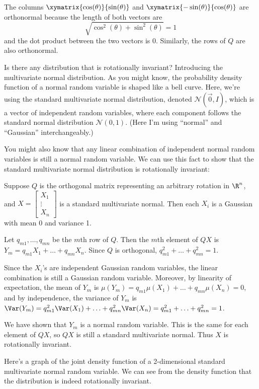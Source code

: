 \documentclass{article}
\begin{document}
The columns $\xymatrix{\cos(\theta)}{\sin(\theta)}$ and $\xymatrix{-\sin(\theta)}{\cos(\theta)}$ are orthonormal because the length of both vectors are
\[
  \sqrt{\cos^2(\theta) + \sin^2(\theta)} = 1
\]
and the dot product between the two vectors is 0. Similarly, the rows of $Q$ are also orthonormal.


Is there any distribution that is rotationally invariant? Introducing the multivariate normal distribution. As you might know, the probability density function of a normal random variable is shaped like a bell curve. Here, we're using the standard multivariate normal distribution, denoted $\mathcal{N}(\vec{0}, I)$, which is a vector of independent random variables, where each component follows the standard normal distribution $\mathcal{N}(0, 1)$. (Here I'm using ``normal'' and ``Gaussian'' interchangeably.)

You might also know that any linear combination of independent normal random variables is still a normal random variable. We can use this fact to show that the standard multivariate normal distribution is rotationally invariant:

Suppose $Q$ is the orthogonal matrix representing an arbitrary rotation in $\R^n$, and
$X = \begin{bmatrix}
    X_1 \\ \vdots \\ X_n
  \end{bmatrix}$ is a standard multivariate normal. Then each $X_i$ is a Gaussian with mean 0 and variance 1.

Let $q_{m1}, \ldots, q_{mn}$ be the $m$th row of $Q$. Then the $m$th element of $QX$ is $Y_m = q_{m1} X_1 + \ldots + q_{mn} X_n$. Since $Q$ is orthogonal, $q_{m1}^2 + \ldots + q_{mn}^2 = 1$.

Since the $X_i$'s are independent Gaussian random variables, the linear combination is still a Gaussian random variable. Moreover, by linearity of expectation, the mean of $Y_m$ is $\mu(Y_m) = q_{m1} \mu(X_1) + \ldots + q_{mn} \mu(X_n) = 0$, and by independence, the variance of $Y_m$ is $\Var(Y_m) = q_{m1}^2 \Var(X_1) + \ldots + q_{mn}^2 \Var(X_n) = q_{m1}^2 + \ldots + q_{mn}^2 = 1$.

We have shown that $Y_m$ is a normal random variable. This is the same for each element of $QX$, so $QX$ is still a standard multivariate normal. Thus $X$ is rotationally invariant.

Here's a graph of the joint density function of a 2-dimensional standard multivariate normal random variable. We can see from the density function that the distribution is indeed rotationally invariant.
\end{document}
